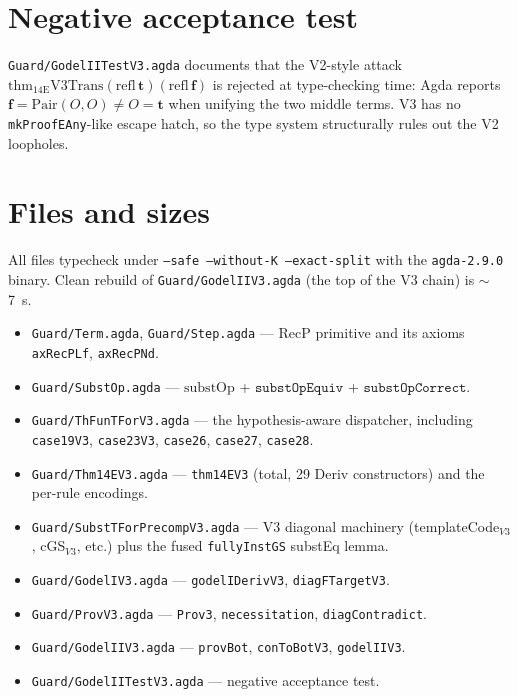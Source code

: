 \documentclass[11pt]{article}
\newcommand{\trueT}{\mathbf{t}}
\newcommand{\falseT}{\mathbf{f}}
\newcommand{\RecP}{\mathrm{RecP}}
\newcommand{\substOp}{\mathrm{substOp}}
\begin{document}
\section{Negative acceptance test}

\texttt{Guard/GodelIITestV3.agda} documents that the V2-style attack
$\mathrm{thm}_{14\mathrm{E}}\mathrm{V}3\mathrm{Trans}(\text{refl}\,\trueT)(\text{refl}\,\falseT)$
is rejected at type-checking time: Agda reports
$\falseT = \mathrm{Pair}(O,O) \neq O = \trueT$ when unifying the two
middle terms.  V3 has no \texttt{mkProofEAny}-like escape hatch, so
the type system structurally rules out the V2 loopholes.

\section{Files and sizes}

All files typecheck under \texttt{--safe --without-K --exact-split}
with the \texttt{agda-2.9.0} binary.  Clean rebuild of
\texttt{Guard/GodelIIV3.agda} (the top of the V3 chain) is $\sim$7~s.

\begin{itemize}
\item \texttt{Guard/Term.agda}, \texttt{Guard/Step.agda} ---
  $\RecP$ primitive and its axioms \texttt{axRecPLf}, \texttt{axRecPNd}.
\item \texttt{Guard/SubstOp.agda} --- $\substOp$ + $\texttt{substOpEquiv}$
  + $\texttt{substOpCorrect}$.
\item \texttt{Guard/ThFunTForV3.agda} --- the hypothesis-aware dispatcher,
  including \texttt{case19V3}, \texttt{case23V3}, \texttt{case26},
  \texttt{case27}, \texttt{case28}.
\item \texttt{Guard/Thm14EV3.agda} --- \texttt{thm14EV3} (total, 29
  Deriv constructors) and the per-rule encodings.
\item \texttt{Guard/SubstTForPrecompV3.agda} --- V3 diagonal machinery
  (templateCode$_{V3}$, cGS$_{V3}$, etc.) plus the fused
  \texttt{fullyInstGS} substEq lemma.
\item \texttt{Guard/GodelIV3.agda} --- \texttt{godelIDerivV3},
  \texttt{diagFTargetV3}.
\item \texttt{Guard/ProvV3.agda} --- \texttt{Prov3},
  \texttt{necessitation}, \texttt{diagContradict}.
\item \texttt{Guard/GodelIIV3.agda} --- \texttt{provBot},
  \texttt{conToBotV3}, \texttt{godelIIV3}.
\item \texttt{Guard/GodelIITestV3.agda} --- negative acceptance test.
\end{itemize}
\end{document}
